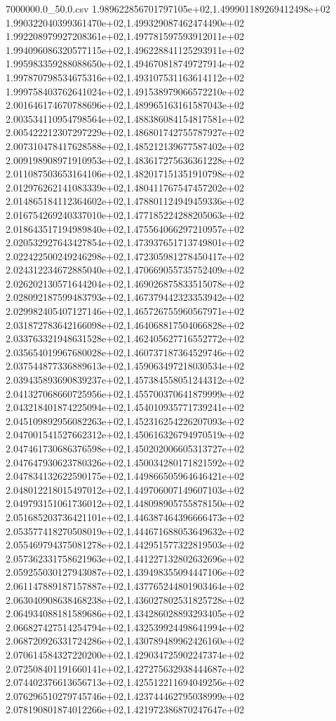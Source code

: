\begin{filecontents*}{7000000.0_50.0.csv}
1.989622856701797105e+02,1.499901189269412498e+02
1.990322040399361470e+02,1.499329087462474490e+02
1.992208979927208361e+02,1.497781597593912011e+02
1.994096086320577115e+02,1.496228841125293911e+02
1.995983359288088650e+02,1.494670818749727914e+02
1.997870798534675316e+02,1.493107531163614112e+02
1.999758403762641024e+02,1.491538979066572210e+02
2.001646174670788696e+02,1.489965163161587043e+02
2.003534110954798564e+02,1.488386084154817581e+02
2.005422212307297229e+02,1.486801742755787927e+02
2.007310478417628588e+02,1.485212139677587402e+02
2.009198908971910953e+02,1.483617275636361228e+02
2.011087503653164106e+02,1.482017151351910798e+02
2.012976262141083339e+02,1.480411767547457202e+02
2.014865184112364602e+02,1.478801124949459336e+02
2.016754269240337010e+02,1.477185224288205063e+02
2.018643517194989840e+02,1.475564066297210957e+02
2.020532927643427854e+02,1.473937651713749801e+02
2.022422500249246298e+02,1.472305981278450417e+02
2.024312234672885040e+02,1.470669055735752409e+02
2.026202130571644204e+02,1.469026875833515078e+02
2.028092187599483793e+02,1.467379442323353942e+02
2.029982405407127146e+02,1.465726755960567971e+02
2.031872783642166098e+02,1.464068817504066828e+02
2.033763321948631528e+02,1.462405627716552772e+02
2.035654019967680028e+02,1.460737187364529746e+02
2.037544877336889613e+02,1.459063497218030534e+02
2.039435893690839237e+02,1.457384558051244312e+02
2.041327068660725956e+02,1.455700370641879999e+02
2.043218401874225094e+02,1.454010935771739241e+02
2.045109892956082263e+02,1.452316254226207093e+02
2.047001541527662312e+02,1.450616326794970519e+02
2.047461730686376598e+02,1.450202006605313727e+02
2.047647930623780326e+02,1.450034280171821592e+02
2.047834132622590175e+02,1.449866505964646421e+02
2.048012218015497012e+02,1.449706007149607103e+02
2.049793151061736012e+02,1.448098905755878150e+02
2.051685203736421101e+02,1.446387464396666473e+02
2.053577418270508019e+02,1.444671688053649632e+02
2.055469794375081278e+02,1.442951577322819503e+02
2.057362331758621963e+02,1.441227132802632696e+02
2.059255030127943087e+02,1.439498355094447106e+02
2.061147889187157887e+02,1.437765244801903464e+02
2.063040908638468238e+02,1.436027802531825728e+02
2.064934088181589686e+02,1.434286028893293405e+02
2.066827427514254794e+02,1.432539924498641994e+02
2.068720926331724286e+02,1.430789489962426160e+02
2.070614584327220200e+02,1.429034725902247374e+02
2.072508401191660141e+02,1.427275632938444687e+02
2.074402376613656713e+02,1.425512211694049256e+02
2.076296510279745746e+02,1.423744462795038999e+02
2.078190801874012266e+02,1.421972386870247647e+02

\end{filecontents*}
